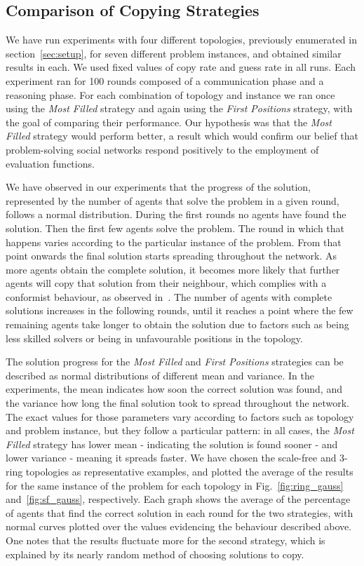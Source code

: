 \documentclass{article}
\begin{document}
\subsection{Comparison of Copying Strategies}

We have run experiments with four different topologies, previously enumerated in section~\ref{sec:setup}, for seven different problem instances, and obtained similar results in each. We used fixed values of copy rate and guess rate in all runs. Each experiment ran for 100 rounds composed of a communication phase and a reasoning phase. For each combination of topology and instance we ran once using the \emph{Most Filled} strategy and again using the \emph{First Positions} strategy, with the goal of comparing their performance. Our hypothesis was that the \emph{Most Filled} strategy would perform better, a result which would confirm our belief that problem-solving social networks respond positively to the employment of evaluation functions.

We have observed in our experiments that the progress of the solution, represented by the number of agents that solve the problem in a given round, follows a normal distribution. During the first rounds no agents have found the solution. Then the first few agents solve the problem. The round in which that happens varies according to the particular instance of the problem. From that point onwards the final solution starts spreading throughout the network. As more agents obtain the complete solution, it becomes more likely that further agents will copy that solution from their neighbour, which complies with a conformist behaviour, as observed in~\cite{farenzena:collabem}. 
The number of agents with complete solutions increases in the following rounds, until it reaches a point where the few remaining agents take longer to obtain the solution due to factors such as being less skilled solvers or being in unfavourable positions in the topology.

The solution progress for the \emph{Most Filled} and \emph{First Positions} strategies can be described as normal distributions of different mean and variance. In the experiments, the mean indicates how soon the correct solution was found, and the variance how long the final solution took to spread throughout the network. The exact values for those parameters vary according to factors such as topology and problem instance, but they follow a particular pattern: in all cases, the \emph{Most Filled} strategy has lower mean - indicating the solution is found sooner - and lower variance - meaning it spreads faster. 
We have chosen the scale-free and 3-ring topologies as representative examples, and plotted the average of the results for the same instance of the problem for each topology in Fig.~\ref{fig:ring_gauss} and~\ref{fig:sf_gauss}, respectively. Each graph shows the average of the percentage of agents that find the correct solution in each round for the two strategies, with normal curves plotted over the values evidencing the behaviour described above. One notes that the results fluctuate more for the second strategy, which is explained by its nearly random method of choosing solutions to copy.
\end{document}
